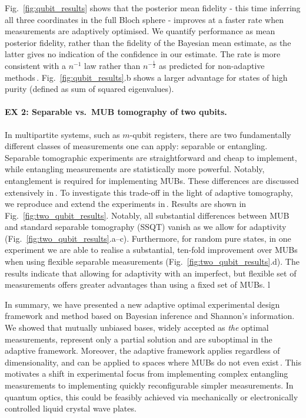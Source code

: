 Fig.\ \ref{fig:qubit_results} shows that the posterior mean fidelity - this time inferring all three coordinates in the full Bloch sphere - improves at a faster rate when measurements are adaptively optimised. We quantify performance as mean posterior fidelity, rather than the fidelity of the Bayesian mean estimate, as the latter gives no indication of the confidence in our estimate. The rate is more consistent with a $n^{-1}$ law rather than $n^{-\frac{1}{2}}$ as predicted for non-adaptive methods\,\cite[][and refs.]{MUBExperiment}. Fig.\ \ref{fig:qubit_results}.b shows a larger advantage for states of high purity (defined as sum of squared eigenvalues).

\paragraph{EX 2: Separable vs.\ MUB tomography of two qubits.} In multipartite systems, such as $m$-qubit registers, there are two fundamentally different classes of measurements one can apply: separable or entangling. Separable tomographic experiments are straightforward and cheap to implement, while entangling measurements are statistically more powerful. Notably, entanglement is required for implementing MUBs. These differences are discussed extensively in\,\cite{MUBExperiment}. To investigate this trade-off in the light of adaptive tomography, we reproduce and extend the experiments in\,\cite{MUBExperiment}. Results are shown in Fig.\ \ref{fig:two_qubit_results}. Notably, all substantial differences between MUB and standard separable tomography (SSQT) vanish as we allow for adaptivity (Fig.\ \ref{fig:two_qubit_results}.a--c). Furthermore, for random pure states, in one experiment we are able to realise a substantial, ten-fold improvement over MUBs when using flexible separable measurements (Fig.\ \ref{fig:two_qubit_results}.d). The results indicate that allowing for adaptivity with an imperfect, but flexible set of measurements offers greater advantages than using a fixed set of MUBs.
l

In summary, we have presented a new adaptive optimal experimental design framework and method based on Bayesian inference and Shannon's information. We showed that mutually unbiased bases, widely accepted as \emph{the} optimal measurements, represent only a partial solution and are suboptimal in the adaptive framework. Moreover, the adaptive framework applies regardless of dimensionality, and can be applied to spaces where MUBs do not even exist\,\cite{DimensionSix,ExactInformation}. This motivates a shift in experimental focus from implementing complex entangling measurements to implementing quickly reconfigurable simpler measurements. In quantum optics, this could be feasibly achieved via mechanically or electronically controlled liquid crystal wave plates.

